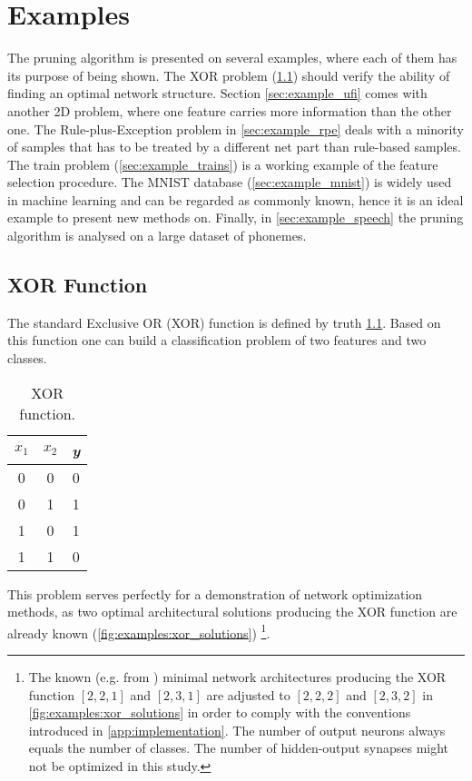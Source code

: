 \chapter{Examples} \label{chap:examples}
The pruning algorithm is presented on several examples, where each of them has its purpose of being shown. The XOR problem (\cref{sec:example_xor}) should verify the ability of finding an optimal network structure. Section \ref{sec:example_ufi} comes with another 2D problem, where one feature carries more information than the other one. The Rule-plus-Exception problem in \cref{sec:example_rpe} deals with a minority of samples that has to be treated by a different net part than rule-based samples. The train problem (\cref{sec:example_trains}) is a working example of the feature selection procedure. The MNIST database (\cref{sec:example_mnist}) is widely used in machine learning and can be regarded as commonly known, hence it is an ideal example to present new methods on. Finally, in \cref{sec:example_speech} the pruning algorithm is analysed on a large dataset of phonemes.

\section{XOR Function} \label{sec:example_xor}
The standard Exclusive OR (XOR) function is defined by truth \cref{tab:examples:xor_function}. Based on this function one can build a classification problem of two features and two classes.

\begin{table}[H]
\centering
\begin{tabular}{|c|c||c|}
\hline
\textit{$ x_1 $} & \textit{$ x_2 $} & \textit{y} \\ \hline \hline
0                & 0                & 0          \\ \hline
0                & 1                & 1          \\ \hline
1                & 0                & 1          \\ \hline
1                & 1                & 0          \\ \hline
\end{tabular}
\caption{XOR function.}
\label{tab:examples:xor_function}
\end{table}

This problem serves perfectly for a demonstration of network optimization methods, as two optimal architectural solutions producing the XOR function are already known (\cref{fig:examples:xor_solutions}) \footnote{The known (e.g. from \citep{online:xor_solution}) minimal network architectures producing the XOR function $ [2, 2, 1] $ and $ [2, 3, 1] $ are adjusted to $ [2, 2, 2] $ and $ [2, 3, 2] $ in \cref{fig:examples:xor_solutions} in order to comply with the conventions introduced in \cref{app:implementation}. The number of output neurons always equals the number of classes. The number of hidden-output synapses might not be optimized in this study.}. 


